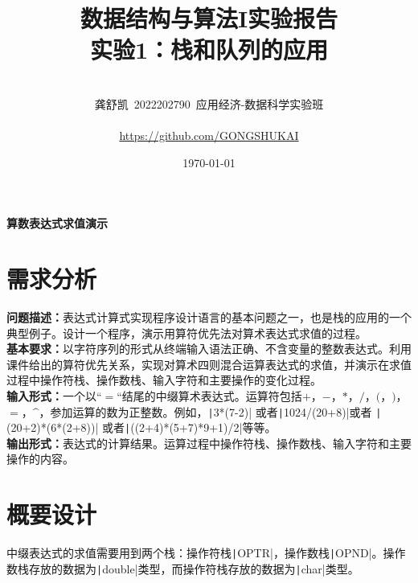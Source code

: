 \documentclass[10pt,a4paper]{article}
\begin{document}
\title{{\Huge 数据结构与算法I实验报告{\large\linebreak\\}}{\huge 实验1：栈和队列的应用\linebreak\linebreak}}
\vspace{3cm}
\author{\\ \Large 龚舒凯\ 2022202790\ 应用经济-数据科学实验班\\
	\hfill\\
	\Large{\url{https://github.com/GONGSHUKAI}}\\
	\hfill}

\date{\today}
\maketitle
\newpage
\begin{center}
	{\huge \textbf{算数表达式求值演示}}
\end{center}
	\section{需求分析}
	\noindent \textbf{问题描述：}表达式计算式实现程序设计语言的基本问题之一，也是栈的应用的一个典型例子。设计一个程序，演示用算符优先法对算术表达式求值的过程。\\
	
	\noindent \textbf{基本要求：}以字符序列的形式从终端输入语法正确、不含变量的整数表达式。利用课件给出的算符优先关系，实现对算术四则混合运算表达式的求值，并演示在求值过程中操作符栈、操作数栈、输入字符和主要操作的变化过程。\\
	
	\noindent \textbf{输入形式：}一个以“$=$“结尾的中缀算术表达式。运算符包括$+$，$-$，$*$，$/$，$($，$)$，$=$，$\^$，参加运算的数为正整数。例如，\texttt|3*(7-2)| 或者\texttt|1024/(20+8)|或者 \texttt|(20+2)*(6*(2+8))| 或者\texttt|((2+4)*(5+7)*9+1)/2|等等。\\
	
	\noindent \textbf{输出形式：}表达式的计算结果。运算过程中操作符栈、操作数栈、输入字符和主要操作的内容。
	\newpage
	\section{概要设计}
	\noindent 中缀表达式的求值需要用到两个栈：操作符栈\texttt|OPTR|，操作数栈\texttt|OPND|。操作数栈存放的数据为\texttt|double|类型，而操作符栈存放的数据为\texttt|char|类型。
\end{document}
